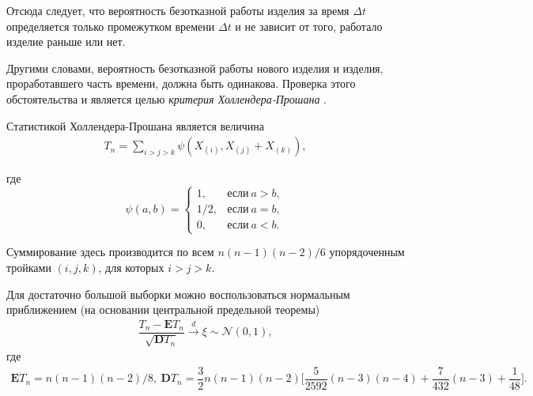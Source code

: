 \documentclass[%
	11pt,
	a4paper,
	utf8,
		]{article}
\begin{document}
Отсюда следует, что вероятность безотказной работы изделия за время $ \Delta t $ определяется только промежутком времени $ \Delta t $ и не зависит от того, работало изделие раньше или нет.

Другими словами, вероятность безотказной работы нового изделия и изделия, проработавшего часть времени, должна быть одинакова. Проверка этого обстоятельства и является целью \emph{критерия Холлендера-Прошана} \cite[295]{kobzar:2012}.

Статистикой Холлендера-Прошана является величина \cite[182]{lagutin:2009}
\begin{align*}
	T_n = \sum_{i > j > k} \psi (X_{(i)}, X_{(j)} + X_{(k)}),
\end{align*}

где
$$
  \psi(a, b) = 
    \begin{cases}
    	1, &\text{если}\ a > b,\\
    	1/2, &\text{если}\ a = b,\\
    	0, &\text{если}\ a < b.
    \end{cases}
$$

Суммирование здесь производится по всем $ n(n-1)(n-2)/6 $ упорядоченным тройками $ (i, j, k) $, для которых $ i > j > k $.

Для достаточно большой выборки можно воспользоваться нормальным приближением (на основании центральной предельной теоремы)
\begin{align*}
	\dfrac{ T_n - \mathbf{E}T_n }{ \sqrt{\mathbf{D}T_n} } \xrightarrow{d} \xi \sim \mathcal{N}(0, 1),
\end{align*}
где
\begin{align*}
	\mathbf{E} T_n = n(n-1)(n-2)/8, \ 
	\mathbf{D} T_n = \dfrac{3}{2}n(n-1)(n-2)\Bigg[ \dfrac{5}{2592}(n - 3)(n - 4) + \dfrac{7}{432}(n - 3) + \dfrac{1}{48} \Bigg].
\end{align*}



\begin{thebibliography}{99}
	
	
\end{thebibliography}
\end{document}
